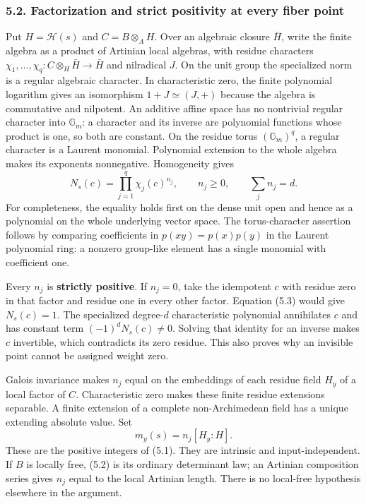 \documentclass[
  10pt,
]{article}
\begin{document}
\subsubsection{5.2. Factorization and strict positivity at every fiber
point}\label{factorization-and-strict-positivity-at-every-fiber-point}

Put \(H=\mathcal H(s)\) and \(C=B\otimes_AH\). Over an algebraic closure
\(\bar H\), write the finite algebra as a product of Artinian local
algebras, with residue characters
\(\chi_1,\ldots,\chi_q:C\otimes_H\bar H\to\bar H\) and nilradical \(J\).
On the unit group the specialized norm is a regular algebraic character.
In characteristic zero, the finite polynomial logarithm gives an
isomorphism \(1+J\simeq(J,+)\) because the algebra is commutative and
nilpotent. An additive affine space has no nontrivial regular character
into \(\mathbb G_m\): a character and its inverse are polynomial
functions whose product is one, so both are constant. On the residue
torus \((\mathbb G_m)^q\), a regular character is a Laurent monomial.
Polynomial extension to the whole algebra makes its exponents
nonnegative. Homogeneity gives
\[N_s(c)=\prod_{j=1}^q\chi_j(c)^{n_j},\qquad n_j\ge0,\qquad\sum_j n_j=d.\tag{5.3}\]
For completeness, the equality holds first on the dense unit open and
hence as a polynomial on the whole underlying vector space. The
torus-character assertion follows by comparing coefficients in
\(p(xy)=p(x)p(y)\) in the Laurent polynomial ring: a nonzero group-like
element has a single monomial with coefficient one.

Every \(n_j\) is \textbf{strictly positive}. If \(n_j=0\), take the
idempotent \(c\) with residue zero in that factor and residue one in
every other factor. Equation (5.3) would give \(N_s(c)=1\). The
specialized degree-\(d\) characteristic polynomial annihilates \(c\) and
has constant term \((-1)^dN_s(c)\ne0\). Solving that identity for an
inverse makes \(c\) invertible, which contradicts its zero residue. This
also proves why an invisible point cannot be assigned weight zero.

Galois invariance makes \(n_j\) equal on the embeddings of each residue
field \(H_y\) of a local factor of \(C\). Characteristic zero makes
these finite residue extensions separable. A finite extension of a
complete non-Archimedean field has a unique extending absolute value.
Set \[m_y(s)=n_j[H_y:H].\tag{5.4}\] These are the positive integers of
(5.1). They are intrinsic and input-independent. If \(B\) is locally
free, (5.2) is its ordinary determinant law; an Artinian composition
series gives \(n_j\) equal to the local Artinian length. There is no
local-free hypothesis elsewhere in the argument.
\end{document}
